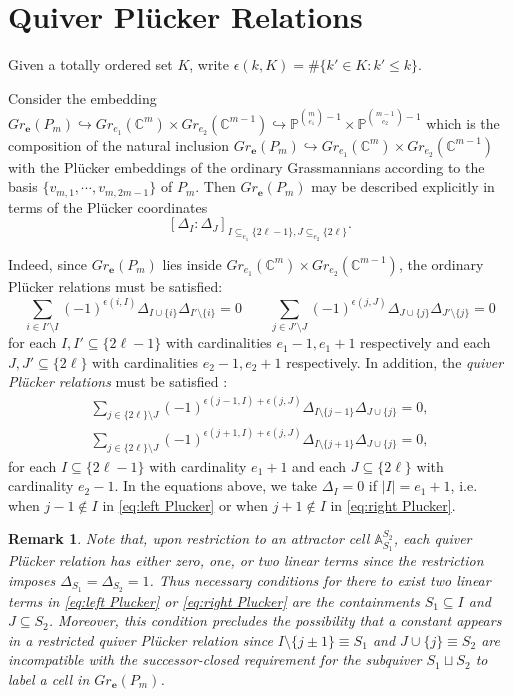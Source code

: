 \documentclass{amsart}
\newtheorem{remark}[theorem]{Remark}
\numberwithin{equation}{section}
\renewcommand{\AA}{\mathbb{A}}
\newcommand{\CC}{\mathbb{C}}
\newcommand{\PP}{\mathbb{P}}
\newcommand{\bfe}{\mathbf{e}}
\newcommand{\into}{\hookrightarrow}
\begin{document}
\section{Quiver Pl\"ucker Relations}
  Given a totally ordered set $K$, write $\epsilon(k,K)=\#\{k'\in K: k'\le k\}$.

  Consider the embedding $Gr_\bfe(P_m)\into Gr_{e_1}(\CC^m)\times Gr_{e_2}(\CC^{m-1})\into \PP^{{m \choose e_1} - 1}\times \PP^{{m-1 \choose e_2} - 1}$ which is the composition of the natural inclusion $Gr_\bfe(P_m)\into Gr_{e_1}(\CC^m)\times Gr_{e_2}(\CC^{m-1})$ with the Pl\"ucker embeddings of the ordinary Grassmannians according to the basis $\{v_{m,1},\cdots,v_{m,2m-1}\}$ of $P_m$.
  Then $Gr_\bfe(P_m)$ may be described explicitly in terms of the Pl\"ucker coordinates
  \[[\Delta_I:\Delta_J]_{I\subseteq_{e_1} \{2\ell-1\}, J\subseteq_{e_2} \{2\ell\}}.\]

  Indeed, since $Gr_\bfe(P_m)$ lies inside $Gr_{e_1}(\CC^m)\times Gr_{e_2}(\CC^{m-1})$, the ordinary Pl\"ucker relations must be satisfied:
  \[\sum_{i\in I'\setminus I} (-1)^{\epsilon(i,I)} \Delta_{I\cup\{i\}} \Delta_{I'\setminus\{i\}}=0
    \qquad
    \sum_{j\in J'\setminus J} (-1)^{\epsilon(j,J)} \Delta_{J\cup\{j\}} \Delta_{J'\setminus\{j\}}=0\]
  for each $I,I'\subseteq\{2\ell-1\}$ with cardinalities $e_1-1,e_1+1$ respectively and each $J,J'\subseteq\{2\ell\}$ with cardinalities $e_2-1,e_2+1$ respectively.
  In addition, the \emph{quiver Pl\"ucker relations} must be satisfied \cite{lorscheid-weist}:
  \begin{align}
    \label{eq:left Plucker} \sum_{j\in \{2\ell\}\setminus J} (-1)^{\epsilon(j-1,I)+\epsilon(j,J)} \Delta_{I\setminus\{j-1\}} \Delta_{J\cup\{j\}}=0,\\
    \label{eq:right Plucker} \sum_{j\in \{2\ell\}\setminus J} (-1)^{\epsilon(j+1,I)+\epsilon(j,J)} \Delta_{I\setminus\{j+1\}} \Delta_{J\cup\{j\}}=0,
  \end{align}
  for each $I\subseteq\{2\ell-1\}$ with cardinality $e_1+1$ and each $J\subseteq\{2\ell\}$ with cardinality $e_2-1$.
  In the equations above, we take $\Delta_I=0$ if $|I|=e_1+1$, i.e. when $j-1\notin I$ in \eqref{eq:left Plucker} or when $j+1\notin I$ in \eqref{eq:right Plucker}.
  \begin{remark}
    \label{rm:linear terms}
    Note that, upon restriction to an attractor cell $\AA_{S_1}^{S_2}$, each quiver Pl\"ucker relation has either zero, one, or two linear terms since the restriction imposes $\Delta_{S_1}=\Delta_{S_2}=1$.
    Thus necessary conditions for there to exist two linear terms in \eqref{eq:left Plucker} or \eqref{eq:right Plucker} are the containments $S_1\subseteq I$ and $J\subseteq S_2$.
    Moreover, this condition precludes the possibility that a constant appears in a restricted quiver Pl\"ucker relation since $I\setminus\{j\pm1\}\equiv S_1$ and $J\cup\{j\}\equiv S_2$ are incompatible with the successor-closed requirement for the subquiver $S_1\sqcup S_2$ to label a cell in $Gr_\bfe(P_m)$.
  \end{remark}
\end{document}
